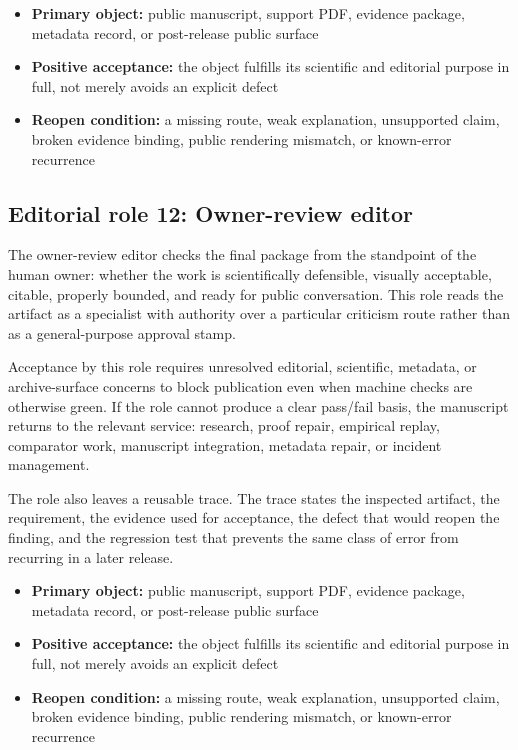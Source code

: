 \begin{itemize}[leftmargin=1.8em]

\item \textbf{Primary object:} public manuscript, support PDF, evidence package, metadata record, or post-release public surface

\item \textbf{Positive acceptance:} the object fulfills its scientific and editorial purpose in full, not merely avoids an explicit defect

\item \textbf{Reopen condition:} a missing route, weak explanation, unsupported claim, broken evidence binding, public rendering mismatch, or known-error recurrence

\end{itemize}

\subsection{Editorial role 12: Owner-review editor}

The owner-review editor checks the final package from the standpoint of the human owner: whether the work is scientifically defensible, visually acceptable, citable, properly bounded, and ready for public conversation. This role reads the artifact as a specialist with authority over a particular criticism route rather than as a general-purpose approval stamp.


Acceptance by this role requires unresolved editorial, scientific, metadata, or archive-surface concerns to block publication even when machine checks are otherwise green. If the role cannot produce a clear pass/fail basis, the manuscript returns to the relevant service: research, proof repair, empirical replay, comparator work, manuscript integration, metadata repair, or incident management.


The role also leaves a reusable trace. The trace states the inspected artifact, the requirement, the evidence used for acceptance, the defect that would reopen the finding, and the regression test that prevents the same class of error from recurring in a later release.


\begin{itemize}[leftmargin=1.8em]

\item \textbf{Primary object:} public manuscript, support PDF, evidence package, metadata record, or post-release public surface

\item \textbf{Positive acceptance:} the object fulfills its scientific and editorial purpose in full, not merely avoids an explicit defect

\item \textbf{Reopen condition:} a missing route, weak explanation, unsupported claim, broken evidence binding, public rendering mismatch, or known-error recurrence

\end{itemize}

